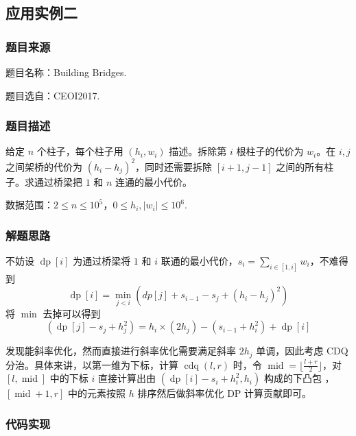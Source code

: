 \subsection{应用实例二}

\subsubsection{题目来源}

题目名称：Building Bridges.

题目选自：CEOI2017.

\subsubsection{题目描述}

给定 \(n\) 个柱子，每个柱子用 \((h_i,w_i)\) 描述。拆除第 \(i\)
根柱子的代价为 \(w_i\)。在 \(i,j\) 之间架桥的代价为
\((h_i-h_j)^2\)，同时还需要拆除 \([i+1,j-1]\)
之间的所有柱子。求通过桥梁把 \(1\) 和 \(n\) 连通的最小代价。

数据范围：\(2\leq n\leq 10^5\)，\(0\leq h_i,|w_i|\leq 10^6\).

\subsubsection{解题思路}

不妨设 \(\operatorname{dp}[i]\) 为通过桥梁将 \(1\) 和 \(i\)
联通的最小代价，\(s_i=\sum_{i\in[1,i]}w_i\)，不难得到 \[
\operatorname{dp}[i]=\min_{j\lt i}(dp[j]+s_{i-1}-s_j+(h_i-h_j)^2)
\] 将 \(\min\) 去掉可以得到 \[
(\operatorname{dp}[j]-s_j+h_j^2)=h_i\times(2h_j)-(s_{i-1}+h_i^2)+\operatorname{dp}[i]
\]

发现能斜率优化，然而直接进行斜率优化需要满足斜率 \(2h_j\) 单调，因此考虑
CDQ 分治。具体来讲，以第一维为下标，计算 \(\operatorname{cdq}(l,r)\)
时，令 \(\operatorname{mid}=\lfloor\frac{l+r}{2}\rfloor\)，对
\([l,\operatorname{mid}]\) 中的下标 \(i\) 直接计算出由
\((\operatorname{dp}[i]-s_i+h_i^2,h_i)\) 构成的下凸包
，\([\operatorname{mid}+1,r]\) 中的元素按照 \(h\) 排序然后做斜率优化 DP
计算贡献即可。

\subsubsection{代码实现}

